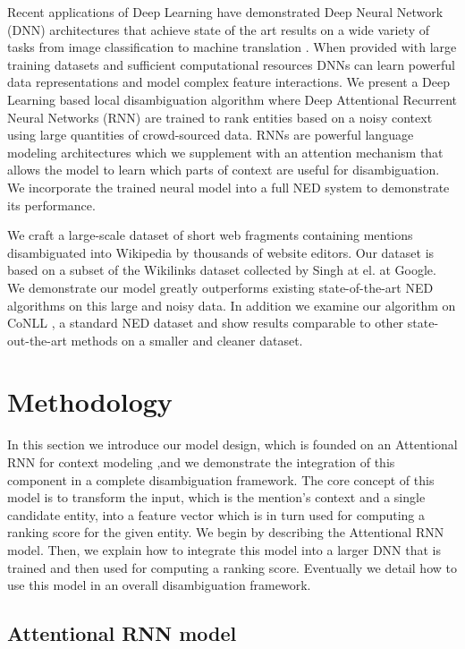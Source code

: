 \documentclass[11pt]{article}
\begin{document}
	Recent applications of Deep Learning have demonstrated Deep Neural Network (DNN) architectures that achieve state of the art results on a wide variety of tasks from image classification \cite{krizhevsky2012imagenet} to machine translation \cite{bahdanau2014neural}. When provided with large training datasets and sufficient computational resources DNNs can learn powerful data representations and model complex feature interactions. We present a Deep Learning based local disambiguation algorithm where Deep Attentional Recurrent Neural Networks (RNN) are trained to rank entities based on a noisy context using large quantities of crowd-sourced data. RNNs are powerful language modeling architectures which we supplement with an attention mechanism that allows the model to learn which parts of context are useful for disambiguation. We incorporate the trained neural model into a full NED system to demonstrate its performance.
	
	We craft a large-scale dataset of short web fragments containing mentions disambiguated into Wikipedia by thousands of website editors. Our dataset is based on a subset of the Wikilinks dataset \cite{singh12:wiki-links} collected by Singh at el. at Google. We demonstrate our model greatly outperforms existing state-of-the-art NED algorithms on this large and noisy data. In addition we examine our algorithm on CoNLL \cite{hoffart2011robust}, a standard NED dataset and show results comparable to other state-out-the-art methods on a smaller and cleaner dataset.
	
	\section{Methodology}
	
	In this section we introduce our model design, which is founded on an Attentional RNN for context modeling ,and we demonstrate the integration of this component in a complete disambiguation framework. The core concept of this model is to transform the input, which is the mention's context and a single candidate entity, into a feature vector which is in turn used for computing a ranking score for the given entity. We begin by describing the Attentional RNN model. Then, we explain how to integrate this model into a larger DNN that is trained and then used for computing a ranking score. Eventually we detail how to use this model in an overall disambiguation framework.
	
	\subsection{Attentional RNN model}
	
\end{document}
